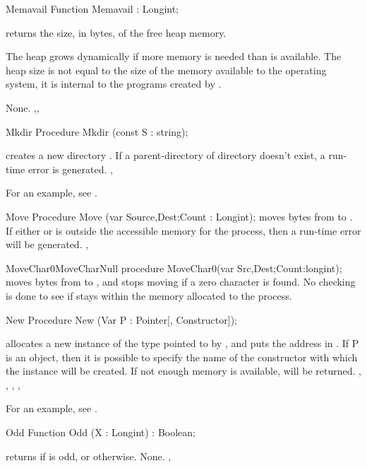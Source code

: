 
\begin{function}{Memavail}
\Declaration
Function Memavail  : Longint;

\Description
{} returns the size, in bytes, of the free heap memory.
\begin{remark}
The heap grows dynamically if more memory is needed than is available. The
heap size is not equal to the size of the memory available to the
operating system, it is internal to the programs created by \fpc.
\end{remark}
\Errors
None.
\SeeAlso
{},, 
\end{function}


\begin{procedure}{Mkdir}
\Declaration
Procedure Mkdir (const S : string);

\Description
{} creates a new  directory .
\Errors
If a parent-directory of directory  doesn't exist, a run-time error is generated.
\SeeAlso
{}, 
\end{procedure}
For an example, see .
\begin{procedure}{Move}
\Declaration
Procedure Move (var Source,Dest;Count : Longint);
\Description
{} moves  bytes from  to .
\Errors
If either  or  is outside the accessible memory for
the process, then a run-time error will be generated.
\SeeAlso
{}, 
\end{procedure}


\begin{procedurel}{MoveChar0}{MoveCharNull}
\Declaration
procedure MoveChar0(var Src,Dest;Count:longint);
\Description
{} moves  bytes from  to , and
stops moving if a zero character is found.
\Errors
No checking is done to see if  stays within the memory allocated
to the process.
\SeeAlso
{}
\end{procedurel}


\begin{procedure}{New}
\Declaration
Procedure New (Var P : Pointer[, Constructor]);

\Description
{} allocates a new instance of the type pointed to by , and
puts the address in .
If P is an object, then it is possible to
specify the name of the constructor with which the instance will be created.
\Errors
If not enough memory is available,  will be returned.
\SeeAlso
{}, , , ,
\end{procedure}
For an example, see .
\begin{function}{Odd}
\Declaration
Function Odd (X : Longint) : Boolean;

\Description
{} returns  if  is odd, or  otherwise.
\Errors
None.
\SeeAlso
{}, 
\end{function}

